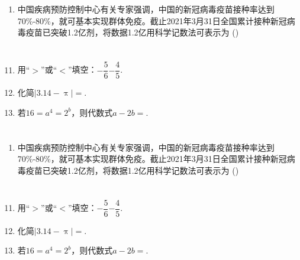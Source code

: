 \documentclass{exam-zh-cn}
\begin{document}
\section{\xzt}
\begin{enumerate}
    \item 中国疾病预防控制中心有关专家强调，中国的新冠病毒疫苗接种率达到70\%-80\%，就可基本实现群体免疫。截止2021年3月31日全国累计接种新冠病毒疫苗已突破1.2亿剂，将数据1.2亿用科学记数法可表示为 (\quad )
\end{enumerate}
\section{\tkt}

\begin{enumerate}
\setcounter{enumi}{10}
\item 用“$>$”或“$<$”填空：$-\dfrac{5}{6}$\tk$-\dfrac{4}{5}$.
\item 化简$|3.14-\uppi|=$\tk .
\item 若$16=a^4=2^b$，则代数式$a-2b=$\tk .
\end{enumerate}
\newpage
\section{\xzt}
\begin{enumerate}
    \item 中国疾病预防控制中心有关专家强调，中国的新冠病毒疫苗接种率达到70\%-80\%，就可基本实现群体免疫。截止2021年3月31日全国累计接种新冠病毒疫苗已突破1.2亿剂，将数据1.2亿用科学记数法可表示为 (\quad )
\end{enumerate}
\section{\tkt}

\begin{enumerate}
\setcounter{enumi}{10}
\item 用“$>$”或“$<$”填空：$-\dfrac{5}{6}$\tk$-\dfrac{4}{5}$.
\item 化简$|3.14-\uppi|=$\tk .
\item 若$16=a^4=2^b$，则代数式$a-2b=$\tk .
\end{enumerate}
\end{document}
